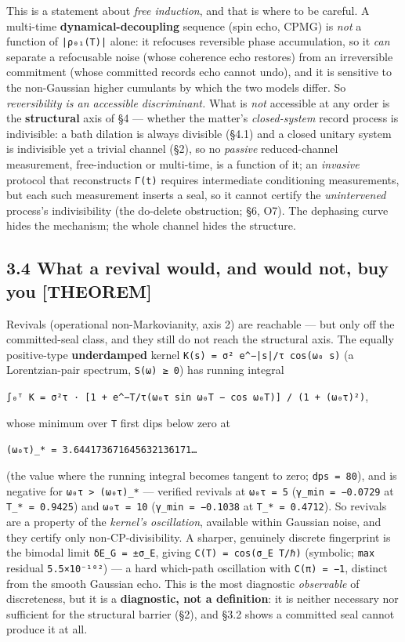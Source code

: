 \documentclass[11pt]{article}
\begin{document}
This is a statement about \emph{free induction}, and that is where to be careful. A multi-time \textbf{dynamical-decoupling} sequence (spin echo, CPMG) is \emph{not} a function of \texttt{|ρ₀₁(T)|} alone: it refocuses reversible phase accumulation, so it \emph{can} separate a refocusable noise (whose coherence echo restores) from an irreversible commitment (whose committed records echo cannot undo), and it is sensitive to the non-Gaussian higher cumulants by which the two models differ. So \emph{reversibility is an accessible discriminant.} What is \emph{not} accessible at any order is the \textbf{structural} axis of §4 — whether the matter's \emph{closed-system} record process is indivisible: a bath dilation is always divisible (§4.1) and a closed unitary system is indivisible yet a trivial channel (§2), so no \emph{passive} reduced-channel measurement, free-induction or multi-time, is a function of it; an \emph{invasive} protocol that reconstructs \texttt{Γ(t)} requires intermediate conditioning measurements, but each such measurement inserts a seal, so it cannot certify the \emph{unintervened} process's indivisibility (the do-delete obstruction; §6, O7). The dephasing curve hides the mechanism; the whole channel hides the structure.

\subsection*{3.4 What a revival would, and would not, buy you [THEOREM]}
Revivals (operational non-Markovianity, axis 2) are reachable — but only off the committed-seal class, and they still do not reach the structural axis. The equally positive-type \textbf{underdamped} kernel \texttt{K(s) = σ² e\textasciicircum{}{−|s|/τ} cos(ω₀ s)} (a Lorentzian-pair spectrum, \texttt{S(ω) ≥ 0}) has running integral

\texttt{∫₀ᵀ K = σ²τ · [1 + e\textasciicircum{}{−T/τ}(ω₀τ sin ω₀T − cos ω₀T)] / (1 + (ω₀τ)²)},

whose minimum over \texttt{T} first dips below zero at

\texttt{(ω₀τ)\_* = 3.644173671645632136171…}

(the value where the running integral becomes tangent to zero; \texttt{dps = 80}), and is negative for \texttt{ω₀τ > (ω₀τ)\_*} — verified revivals at \texttt{ω₀τ = 5} (\texttt{γ\_min = −0.0729} at \texttt{T\_* = 0.9425}) and \texttt{ω₀τ = 10} (\texttt{γ\_min = −0.1038} at \texttt{T\_* = 0.4712}). So revivals are a property of the \emph{kernel's oscillation}, available within Gaussian noise, and they certify only non-CP-divisibility. A sharper, genuinely discrete fingerprint is the bimodal limit \texttt{δE\_G = ±σ\_E}, giving \texttt{C(T) = cos(σ\_E T/ℏ)} (symbolic; \texttt{max} residual \texttt{5.5×10⁻¹⁰²}) — a hard which-path oscillation with \texttt{C(π) = −1}, distinct from the smooth Gaussian echo. This is the most diagnostic \emph{observable} of discreteness, but it is a \textbf{diagnostic, not a definition}: it is neither necessary nor sufficient for the structural barrier (§2), and §3.2 shows a committed seal cannot produce it at all.
\end{document}
